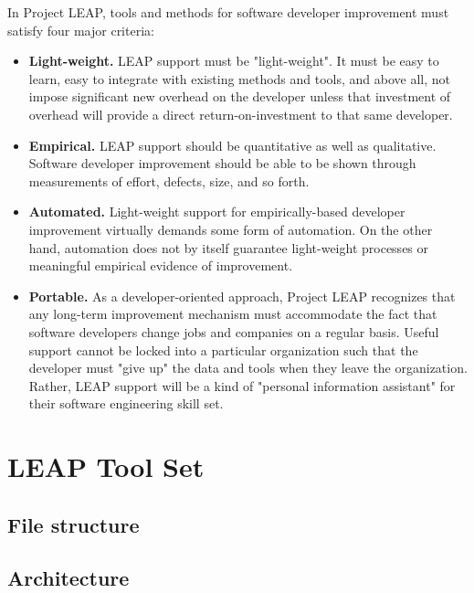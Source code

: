 In Project LEAP, tools and methods for software developer
improvement must satisfy four major criteria: 

\begin{itemize}
  
\item{\bf Light-weight.} LEAP support must be "light-weight".  It must be
  easy to learn, easy to integrate with existing methods and tools, and
  above all, not impose significant new overhead on the developer unless
  that investment of overhead will provide a direct return-on-investment to
  that same developer.
  
\item{\bf Empirical.} LEAP support should be quantitative as well as
  qualitative. Software developer improvement should be able to be shown
  through measurements of effort, defects, size, and so forth.
  
\item{\bf Automated.} Light-weight support for empirically-based developer
  improvement virtually demands some form of automation.  On the other
  hand, automation does not by itself guarantee light-weight processes or
  meaningful empirical evidence of improvement.
  
\item{\bf Portable.} As a developer-oriented approach, Project LEAP
  recognizes that any long-term improvement mechanism must accommodate the
  fact that software developers change jobs and companies on a regular
  basis. Useful support cannot be locked into a particular organization
  such that the developer must "give up" the data and tools when they leave
  the organization. Rather, LEAP support will be a kind of "personal
  information assistant" for their software engineering skill set.

\end{itemize}

\section{LEAP Tool Set}

\subsection{File structure}

\subsection{Architecture}

